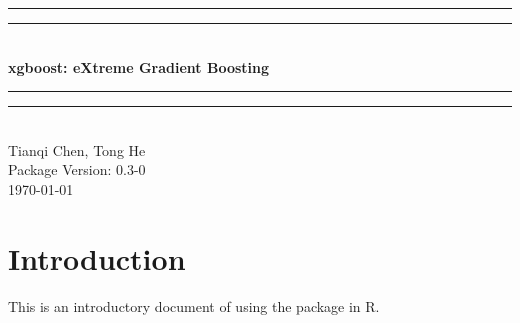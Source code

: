 \documentclass{article}\usepackage[]{graphicx}\usepackage[]{color}
\begin{document}



%

%

    \begin{center}
    \vspace*{6\baselineskip}
    \rule{\textwidth}{1.6pt}\vspace*{-\baselineskip}\vspace*{2pt}
    \rule{\textwidth}{0.4pt}\\[2\baselineskip]
    {\LARGE \textbf{xgboost: eXtreme Gradient Boosting}}\\[1.2\baselineskip]
    \rule{\textwidth}{0.4pt}\vspace*{-\baselineskip}\vspace{3.2pt}
    \rule{\textwidth}{1.6pt}\\[2\baselineskip]
    {\Large Tianqi Chen, Tong He}\\[\baselineskip]
    {\large Package Version: 0.3-0}\\[\baselineskip]
    {\large \today}\par
    \vfill
    \end{center}

\thispagestyle{empty}

\clearpage

\setcounter{page}{1}

\section{Introduction}

This is an introductory document of using the \verb@xgboost@ package in R. 
\end{document}
